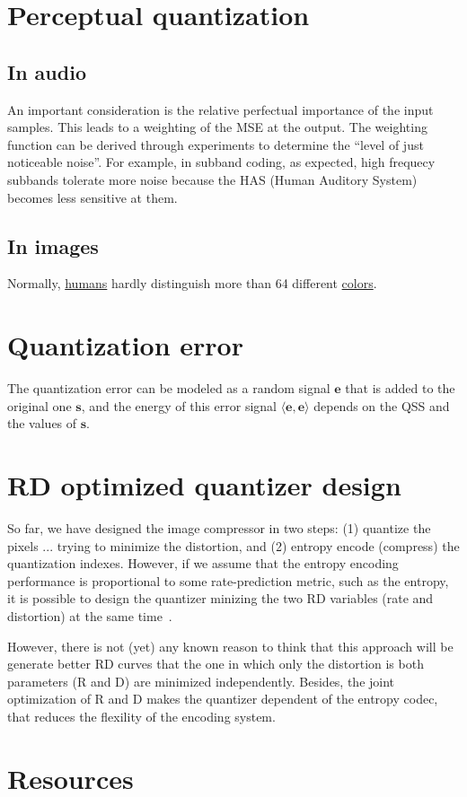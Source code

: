 \section{Perceptual quantization}

\subsection{In audio}

An important consideration is the relative perfectual importance of
the input samples. This leads to a weighting of the MSE at the
output. The weighting function can be derived through experiments to
determine the ``level of just noticeable noise''. For example, in
subband coding, as expected, high frequecy subbands tolerate more
noise because the HAS (Human Auditory System) becomes less sensitive
at them.

\subsection{In images}

Normally, \href{https://en.wikipedia.org/wiki/Visual_system}{humans}
hardly distinguish more than 64 different
\href{https://en.wikipedia.org/wiki/Color}{colors}.


\section{Quantization error}
The quantization error can be modeled as a random signal $\mathbf{e}$
that is added to the original one $\mathbf{s}$, and the energy of this
error signal $\langle \mathbf{e},\mathbf{e}\rangle$ depends on
the QSS and the values of $\mathbf{s}$.

\section{RD optimized quantizer design}
So far, we have designed the image compressor in two steps: (1)
quantize the pixels ... trying to minimize the distortion, and (2) entropy
encode (compress) the quantization indexes. However, if we assume that
the entropy encoding performance is proportional to some
rate-prediction metric, such as the entropy, it is possible to design
the quantizer minizing the two RD variables (rate and distortion) at
the same time~\cite{sayood2017introduction}.

However, there is not (yet) any known reason to think that this
approach will be generate better RD curves that the one in which only
the distortion is both parameters (R and D) are minimized
independently. Besides, the joint optimization of R and D makes the
quantizer dependent of the entropy codec, that reduces the flexility
of the encoding system.

\section{Resources}


